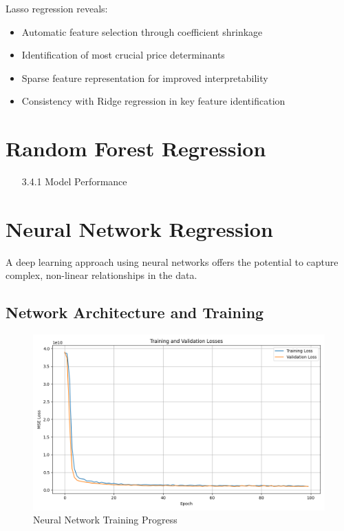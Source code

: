 \documentclass[12pt]{report}
\begin{document}
Lasso regression reveals:
\begin{itemize}
    \item Automatic feature selection through coefficient shrinkage
    \item Identification of most crucial price determinants
    \item Sparse feature representation for improved interpretability
    \item Consistency with Ridge regression in key feature identification
\end{itemize}

\section{Random Forest Regression}
\begin{itemize}
    \item[3.4.1] Model Performance
\end{itemize}

\section{Neural Network Regression}
A deep learning approach using neural networks offers the potential to capture complex, non-linear relationships in the data.

\subsection{Network Architecture and Training}
\begin{figure}[H]
    \centering
    \includegraphics[width=1.0\textwidth]{figures/neural_network_training.png}
    \caption{Neural Network Training Progress}
    \label{fig:nn_training}
\end{figure}
\end{document}
